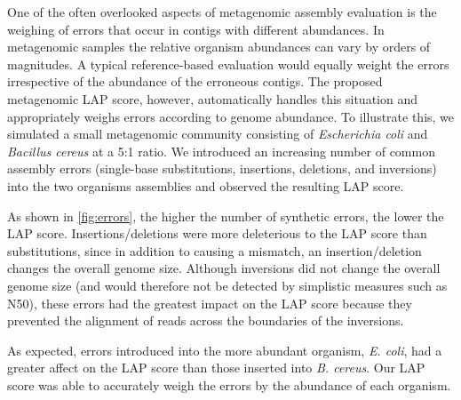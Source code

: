 One of the often overlooked aspects of metagenomic assembly evaluation is the weighing of errors that occur in contigs with different abundances.
In metagenomic samples the relative organism abundances can vary by orders of magnitudes.
A typical reference-based evaluation would equally weight the errors irrespective of the abundance of the erroneous contigs.
The proposed metagenomic LAP score, however, automatically handles this situation and appropriately weighs errors according to genome abundance.
To illustrate this, we simulated a small metagenomic community consisting of \emph{Escherichia coli} and \emph{Bacillus cereus} at a 5:1 ratio.
We introduced an increasing number of common assembly errors (single-base substitutions, insertions, deletions, and inversions) into the two organisms assemblies and observed the resulting LAP score.

As shown in \figurename \ref{fig:errors}, the higher the number of synthetic errors, the lower the LAP score.
Insertions/deletions were more deleterious to the LAP score than substitutions, since in addition to causing a mismatch, an insertion/deletion changes the overall genome size.
Although inversions did not change the overall genome size (and would therefore not be detected by simplistic measures such as N50), these errors had the greatest impact on the LAP score because they prevented the alignment of reads across the boundaries of the inversions.


As expected, errors introduced into the more abundant organism, \emph{E. coli}, had a greater affect on the LAP score than those inserted into \emph{B. cereus}.
Our LAP score was able to accurately weigh the errors by the abundance of each organism.


